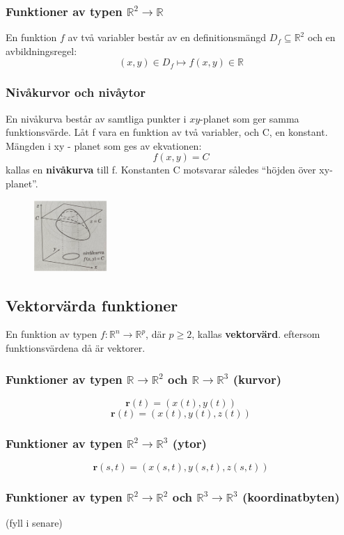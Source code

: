 \documentclass[a4paper,12pt]{article}
\begin{document}
\subsubsection*{Funktioner av typen $\mathbb{R}^2 \to \mathbb{R}$}
En funktion $f$ av två variabler består av en definitionsmängd $D_f \subseteq \mathbb{R}^2$ och en avbildningsregel:
\[
(x,y) \in D_f \mapsto f(x,y) \in \mathbb{R}
\]

\subsubsection*{Nivåkurvor och nivåytor}
En nivåkurva består av samtliga punkter i $xy$-planet som ger samma funktionsvärde. 
Låt f vara en funktion av två variabler, och C, en konstant. Mängden i xy - planet som ges av ekvationen:
\[
    f(x,y) = C
\]
kallas en \textbf{nivåkurva} till f. Konstanten C motsvarar således “höjden över xy-planet”.
\begin{figure}[H]
  \centering
  \includegraphics[width=0.25\textwidth]{nivakurva.png}
  \caption{}
\end{figure}

\subsection{Vektorvärda funktioner}
En funktion av typen $f: \mathbb{R}^n \to \mathbb{R}^p$, där $p \ge 2$, kallas \textbf{vektorvärd}.
eftersom funktionsvärdena då är vektorer.
\subsubsection*{Funktioner av typen $\mathbb{R} \to \mathbb{R}^2$ och $\mathbb{R} \to \mathbb{R}^3$ (kurvor)}
\[
    \textbf{r}(t) = (x(t), y(t))
\]
\[
    \textbf{r}(t) = (x(t), y(t), z(t))
\]

\subsubsection*{Funktioner av typen $\mathbb{R}^2 \to \mathbb{R}^3$ (ytor)}
\[
    \textbf{r}(s, t) = (x(s, t), y(s, t), z(s, t))
\]

\subsubsection*{Funktioner av typen $\mathbb{R}^2 \to \mathbb{R}^2$ och $\mathbb{R}^3 \to \mathbb{R}^3$ (koordinatbyten)}
(fyll i senare)
\end{document}

